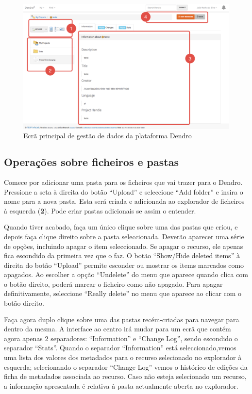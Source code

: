 \documentclass[paper=a4, fontsize=11pt]{scrartcl} %
\numberwithin{equation}{section} %
\numberwithin{figure}{section} %
\numberwithin{table}{section} %
\begin{document}
\begin{figure}[h!t!]
	\centering
	\includegraphics[width=\textwidth]{Images/main_screen}	
	\caption{Ecrã principal de gestão de dados da plataforma Dendro}
	\label{fig:main_screen}
\end{figure}


\subsection{Operações sobre ficheiros e pastas} %
\label{sub:basic_file_and_folder_operations}

Comece por adicionar uma pasta para os ficheiros que vai trazer para o Dendro. Pressione a seta à direita do botão ``Upload'' e seleccione ``Add folder'' e insira o nome para a nova pasta. Esta será criada e adicionada ao explorador de ficheiros à esquerda (\textbf{2}). Pode criar pastas adicionais se assim o entender.

Quando tiver acabado, faça um único clique sobre uma das pastas que criou, e depois faça clique direito sobre a pasta seleccionada. Deverão aparecer uma série de opções, incluindo apagar o item seleccionado. Se apagar o recurso, ele apenas fica escondido da primeira vez que o faz. O botão ``Show/Hide deleted items'' à direita do botão ``Upload''  permite esconder ou mostrar os items marcados como apagados. Ao escolher a opção ``Undelete'' do menu que aparece quando clica com o botão direito, poderá marcar o ficheiro como não apagado. Para apagar definitivamente, seleccione ``Really delete'' no menu que aparece ao clicar com o botão direito. 

Faça agora duplo clique sobre uma das pastas recém-criadas para navegar para dentro da mesma. A interface ao centro irá mudar para um ecrã que contém agora apenas 2 separadores: ``Information'' e ``Change Log'', sendo escondido o separador ``Stats''. Quando o separador ``Information'' está seleccionado,vemos uma lista dos valores dos metadados para o recurso selecionado no explorador à esquerda; selecionando o separador ``Change Log'' vemos o histórico de edições da ficha de metadados associada ao recurso. Caso não esteja selecionado um recurso, a informação apresentada é relativa à pasta actualmente aberta no explorador.
\end{document}
